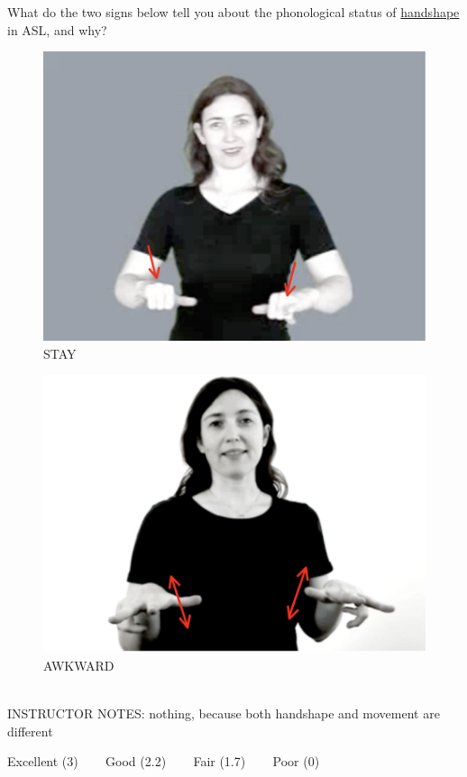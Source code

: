\documentclass[12pt]{article}
\begin{document}
What do the two signs below tell you about the phonological status of \underline{handshape} in ASL, and why?\\

\begin{figure}[H]
\includegraphics{../images/asl_stay.png}
\caption{STAY}
\end{figure}
\begin{figure}[H]
\includegraphics{../images/asl_awkward.png}
\caption{AWKWARD}
\end{figure}

~\\
INSTRUCTOR NOTES: nothing, because both handshape and movement are different


\vfill
Excellent (3) ~~~ Good (2.2) ~~~ Fair (1.7) ~~~ Poor (0)
\newpage
\end{document}
